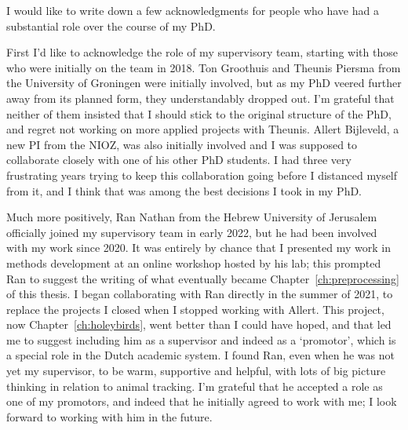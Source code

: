 \label{ch:ack}


\bigskip

\begingroup
\let\clearpage\relax
\let\cleardoublepage\relax
\let\cleardoublepage\relax

I would like to write down a few acknowledgments for people who have had a substantial role over the course of my PhD.

First I'd like to acknowledge the role of my supervisory team, starting with those who were initially on the team in 2018.
Ton Groothuis and Theunis Piersma from the University of Groningen were initially involved, but as my PhD veered further away from its planned form, they understandably dropped out.
I'm grateful that neither of them insisted that I should stick to the original structure of the PhD, and regret not working on more applied projects with Theunis.
Allert Bijleveld, a new PI from the NIOZ, was also initially involved and I was supposed to collaborate closely with one of his other PhD students.
I had three very frustrating years trying to keep this collaboration going before I distanced myself from it, and I think that was among the best decisions I took in my PhD.

Much more positively, Ran Nathan from the Hebrew University of Jerusalem officially joined my supervisory team in early 2022, but he had been involved with my work since 2020.
It was entirely by chance that I presented my work in methods development at an online workshop hosted by his lab; this prompted Ran to suggest the writing of what eventually became Chapter~\ref{ch:preprocessing} of this thesis.
I began collaborating with Ran directly in the summer of 2021, to replace the projects I closed when I stopped working with Allert.
This project, now Chapter~\ref{ch:holeybirds}, went better than I could have hoped, and that led me to suggest including him as a supervisor and indeed as a `promotor', which is a special role in the Dutch academic system.
I found Ran, even when he was not yet my supervisor, to be warm, supportive and helpful, with lots of big picture thinking in relation to animal tracking.
I'm grateful that he accepted a role as one of my promotors, and indeed that he initially agreed to work with me; I look forward to working with him in the future.


